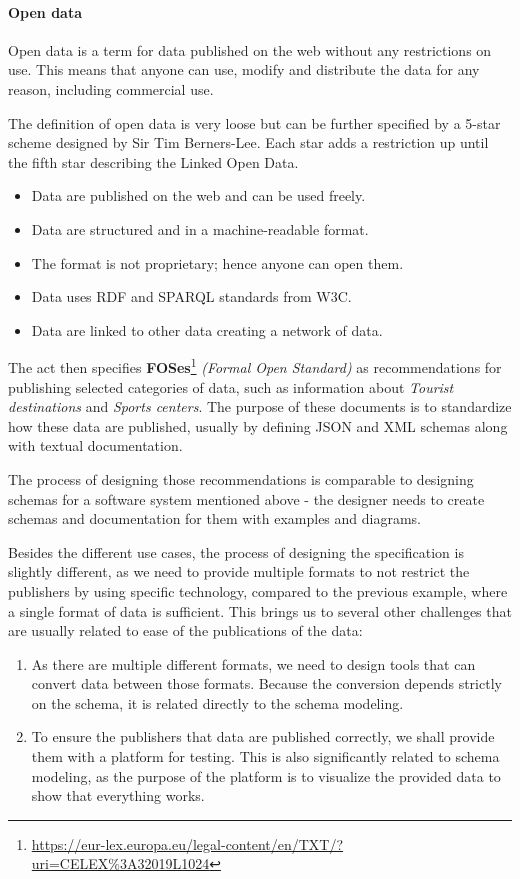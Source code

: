 \paragraph{Open data} Open data is a term for data published on the web without any restrictions on use. This means that anyone can use, modify and distribute the data for any reason, including commercial use.

The definition of open data is very loose but can be further specified by a 5-star scheme designed by Sir Tim Berners-Lee. Each star adds a restriction up until the fifth star describing the Linked Open Data.
\begin{itemize}[noitemsep,leftmargin=2cm]
    \item [1 $\bigstar$] Data are published on the web and can be used freely.
    \item [2 $\bigstar$] Data are structured and in a machine-readable format.
    \item [3 $\bigstar$] The format is not proprietary; hence anyone can open them.
    \item [4 $\bigstar$] Data uses RDF and SPARQL standards from W3C.
    \item [5 $\bigstar$] Data are linked to other data creating a network of data.
\end{itemize}

\bigskip

The act then specifies \textbf{FOSes}\footnote{\url{https://eur-lex.europa.eu/legal-content/en/TXT/?uri=CELEX\%3A32019L1024}} \textit{(Formal Open Standard)} as recommendations for publishing selected categories of data, such as information about \textit{Tourist destinations} and \textit{Sports centers}. The purpose of these documents is to standardize how these data are published, usually by defining JSON and XML schemas along with textual documentation.

The process of designing those recommendations is comparable to designing schemas for a software system mentioned above - the designer needs to create schemas and documentation for them with examples and diagrams.

Besides the different use cases, the process of designing the specification is slightly different, as we need to provide multiple formats to not restrict the publishers by using specific technology, compared to the previous example, where a single format of data is sufficient. This brings us to several other challenges that are usually related to ease of the publications of the data:
\begin{enumerate}
  \item As there are multiple different formats, we need to design tools that can convert data between those formats. Because the conversion depends strictly on the schema, it is related directly to the schema modeling.
  \item To ensure the publishers that data are published correctly, we shall provide them with a platform for testing. This is also significantly related to schema modeling, as the purpose of the platform is to visualize the provided data to show that everything works.
\end{enumerate}

